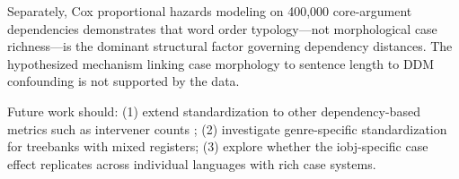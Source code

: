 \documentclass[11pt,letterpaper]{article}
\begin{document}
Separately, Cox proportional hazards modeling on 400,000 core-argument dependencies demonstrates that word order typology---not morphological case richness---is the dominant structural factor governing dependency distances. The hypothesized mechanism linking case morphology to sentence length to DDM confounding is not supported by the data.

Future work should: (1) extend standardization to other dependency-based metrics such as intervener counts \citep{Yadav2022}; (2) investigate genre-specific standardization for treebanks with mixed registers; (3) explore whether the iobj-specific case effect replicates across individual languages with rich case systems.



\end{document}

